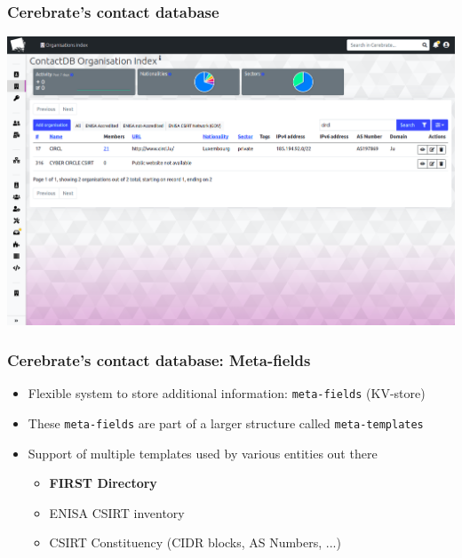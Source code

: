 \begin{frame}
\frametitle{Cerebrate's contact database}
    \begin{center}
        \includegraphics[width=0.99\linewidth]{pictures/contact-database-2.png}
    \end{center}
\end{frame}

\begin{frame}
\frametitle{Cerebrate's contact database: Meta-fields}
    \begin{itemize}
        \item Flexible system to store additional information: \texttt{meta-fields} (KV-store)
        \item These \texttt{meta-fields} are part of a larger structure called \texttt{meta-templates}
        \item Support of multiple templates used by various entities out there
        \begin{itemize}
            \item {\bf FIRST Directory}
            \item ENISA CSIRT inventory
            \item CSIRT Constituency (CIDR blocks, AS Numbers, ...)
        \end{itemize}
    \end{itemize}
\end{frame}

